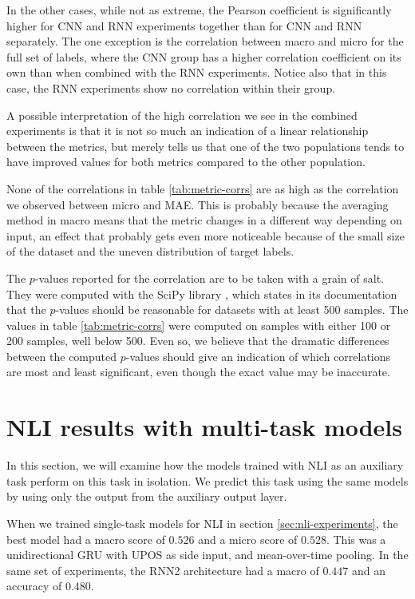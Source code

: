 In the other cases, while not as extreme, the Pearson coefficient is
significantly higher for CNN and RNN experiments together than for CNN and
RNN separately. The one exception is the correlation between macro \FI and
micro \FI for the full set of labels, where the CNN group has a higher
correlation coefficient on its own than when combined with the RNN
experiments. Notice also that in this case, the RNN experiments show no
correlation within their group.

A possible interpretation of the high correlation we see in the combined
experiments is that it is not so much an indication of a linear relationship
between the metrics, but merely tells us that one of the two populations
tends to have improved values for both metrics compared to the other
population.

None of the correlations in table \ref{tab:metric-corrs} are as high as the
correlation we observed between micro \FI and \ac{MAE}. This is probably
because the averaging method in macro \FI means that the metric changes in a
different way depending on input, an effect that probably gets even more
noticeable because of the small size of the dataset and the uneven
distribution of target labels.

The $p$-values reported for the correlation are to be taken with a grain of
salt. They were computed with the SciPy library \autocite{scipy}, which
states in its documentation that the $p$-values should be reasonable for
datasets with at least 500 samples. The values in table
\ref{tab:metric-corrs} were computed on samples with either 100 or 200
samples, well below 500. Even so, we believe that the dramatic differences
between the computed $p$-values should give an indication of which
correlations are most and least significant, even though the exact value may
be inaccurate.


\section{NLI results with multi-task models}

In this section, we will examine how the models trained with \ac{NLI} as an
auxiliary task perform on this task in isolation. We predict this task using
the same models by using only the output from the auxiliary output layer.

When we trained single-task models for \ac{NLI} in section
\ref{sec:nli-experiments}, the best model had a macro \FI score of $0.526$
and a micro \FI score of $0.528$. This was a unidirectional GRU with UPOS as
side input, and mean-over-time pooling. In the same set of experiments, the
RNN2 architecture had a macro \FI of $0.447$ and an accuracy of $0.480$.

